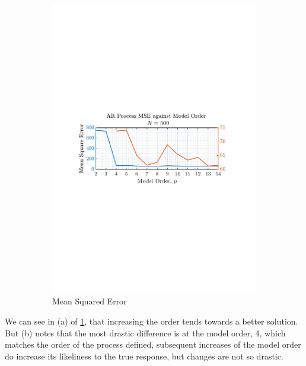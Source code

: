 \documentclass[12pt]{article}
\begin{document}
\begin{figure}[H]
\begin{subfigure}{0.49\textwidth}
			\includegraphics[trim={2.2cm 11.2cm 3.15cm  11.2cm}, clip, width=\textwidth]{../MATLAB/figures/q1_4b_fig16.pdf} 
			\captionsetup{justification=centering}
			\caption{Mean Squared Error}
		\end{subfigure}
		\captionsetup{justification=centering}
		\caption{}
		\label{fig: 1-4b}
	\end{figure}

	We can see in (a) of \ref{fig: 1-4b}, that increasing the order tends towards a better solution. But (b) notes that the most drastic difference is at the model order, 4, which matches the order of the process defined, subsequent increases of the model order do increase its likeliness to the true response, but changes are not so drastic.
	
\end{document}
